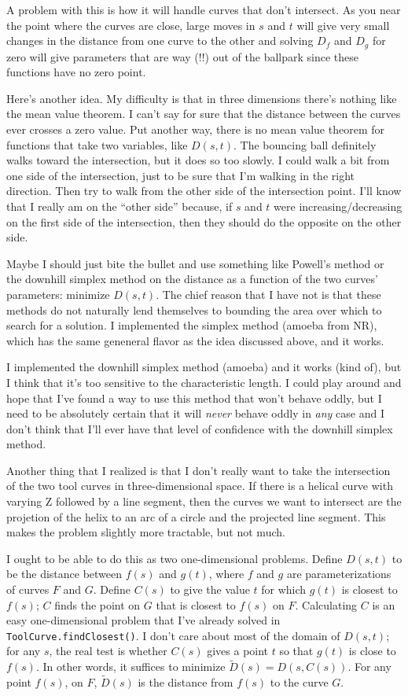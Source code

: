 \documentclass[titlepage,oneside,10pt]{article}
\begin{document}
A problem with this is how it will handle curves that don't
intersect. As you near the point where the curves are close, large
moves in $s$ and $t$ will give very small changes in the distance from
one curve to the other and solving $D_f$ and $D_g$ for zero will give
parameters that are way (!!) out of the ballpark since these functions
have no zero point.

Here's another idea. My difficulty is that in three dimensions there's
nothing like the mean value theorem. I can't say for sure that the
distance between the curves ever crosses a zero value. Put another
way, there is no mean value theorem for functions that take two
variables, like $D(s,t)$. The bouncing ball definitely walks toward the 
intersection, but it does so too slowly. I could walk a bit from one
side of the intersection, just to be sure that I'm walking in the right
direction. Then try to walk from the other side of the intersection
point. I'll know that I really am on the ``other side'' because, if
$s$ and $t$ were increasing/decreasing on the first side of the
intersection, then they should do the opposite on the other side.

Maybe I should just bite the bullet and use something like Powell's
method or the downhill simplex method on the distance as a function of
the two curves' parameters: minimize $D(s,t)$. The chief reason that I
have not is that these methods do not naturally lend themselves to
bounding the area over which to search for a solution. I implemented
the simplex method (amoeba from NR), which has the same geneneral
flavor as the idea discussed above, and it works.

I implemented the downhill simplex method (amoeba) and it works (kind
of), but I think that it's too sensitive to the characteristic
length. I could play around and hope that I've found a way to use this
method that won't behave oddly, but I need to be absolutely certain
that it will \emph{never} behave oddly in \emph{any} case and I don't
think that I'll ever have that level of confidence with the downhill
simplex method.

Another thing that I realized is that I don't really want to take the
intersection of the two tool curves in three-dimensional space. If
there is a helical curve with varying Z followed by a line segment,
then the curves we want to intersect are the projetion of
the helix to an arc of a circle and the projected line segment. This
makes the problem slightly more tractable, but not much.

I ought to be able to do this as two one-dimensional problems. Define
$D(s,t)$ to be the distance between $f(s)$ and $g(t)$, where $f$ and $g$
are parameterizations of curves $F$ and $G$. Define $C(s)$ to give the
value $t$ for which $g(t)$ is closest to $f(s)$; $C$ finds the point on
$G$ that is closest to $f(s)$ on $F$. Calculating $C$ is an easy
one-dimensional problem that I've already solved in 
{\tt ToolCurve.findClosest()}. I don't care about most of the domain
of $D(s,t)$; for any $s$, the real test is whether $C(s)$ gives a
point $t$ so that $g(t)$ is close to $f(s)$. In other words, it
suffices to minimize $\tilde{D}(s) = D(s,C(s))$. For any point $f(s)$,
on $F$, $\tilde{D}(s)$ is the distance from $f(s)$ to the curve $G$.
\end{document}
